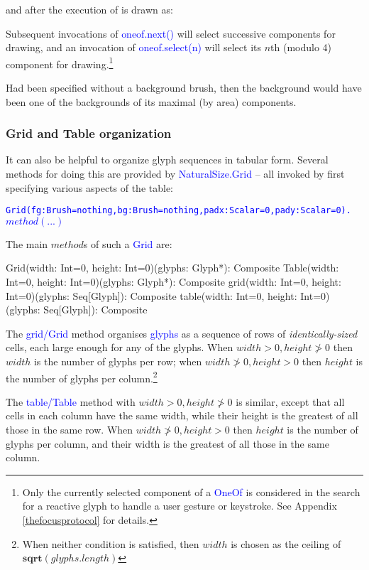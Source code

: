 \documentclass[12pt,a4paper]{article}
\def\Scala#1{\textcolor{blue}{\textsf{#1}}}
\def\SSS#1{\subsubsection*{#1}}
\begin{document}
and after the execution of  is drawn as:
\begin{center}
\end{center}

Subsequent invocations of \Scala{oneof.next()} will select successive components
for drawing, and an invocation of \Scala{oneof.select(n)} will select its $n$th (modulo 4)
component for drawing.\footnote{Only the currently selected component of a
\Scala{OneOf} is considered in the search for a reactive glyph to handle
a user gesture or keystroke. See Appendix \ref{thefocusprotocol} for details.} 

Had  been specified without a background brush, then
the background would have been one of the backgrounds of its
maximal (by area) components.
\begin{center}
\end{center}

\SSS{Grid and Table organization}
It can also be helpful to organize glyph sequences in tabular
form. Several methods for doing
this are provided by \Scala{NaturalSize.Grid} --
all invoked by first specifying various aspects of the table:

\begin{alltt}\textcolor{blue}{Grid(fg: Brush=nothing, bg: Brush=nothing, padx: Scalar=0, pady: Scalar=0).\(method(...)\)}
\end{alltt}

The main $method$s of such a \Scala{Grid} are:
\begin{scala}
  Grid(width:  Int=0, height: Int=0)(glyphs: Glyph*): Composite
  Table(width: Int=0, height: Int=0)(glyphs: Glyph*): Composite
  grid(width:  Int=0, height: Int=0)(glyphs: Seq[Glyph]): Composite
  table(width: Int=0, height: Int=0)(glyphs: Seq[Glyph]): Composite
\end{scala}

The \Scala{grid/Grid} method organises \Scala{glyphs} as a sequence of
rows of \textit{identically-sized} cells,
each large enough for any of the glyphs.
When $width>0, height\not>0$ then $width$ is the
number of glyphs per row; when $width\not>0, height>0$ then
$height$ is the number of glyphs per column.\footnote{When
neither condition is satisfied, then $width$ is chosen
as the ceiling of $\mathbf{sqrt}(glyphs.length)$}

The \Scala{table/Table} method with $width>0, height\not>0$ is similar, except
that all cells in each column have the same width, while their height
is the greatest of all those in the same row. When
$width\not>0, height>0$ then
$height$ is the number of glyphs per column, and their width
is the greatest of all those in the same column.
\end{document}
